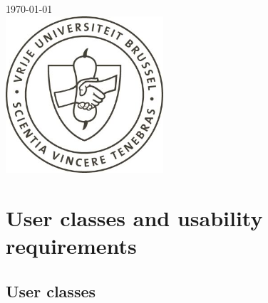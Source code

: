 \documentclass[11pt, a4paper,svglistings]{report}
\begin{document}
\begin{titlepage}
{\large \today}\\[3cm]


\includegraphics[width=2.3in]{vub_schild.jpg}\\[4cm] 
 







\end{titlepage}

\tableofcontents

\listoffigures

\newpage

\chapter{User classes and usability requirements}

\section{User classes}
\end{document}
